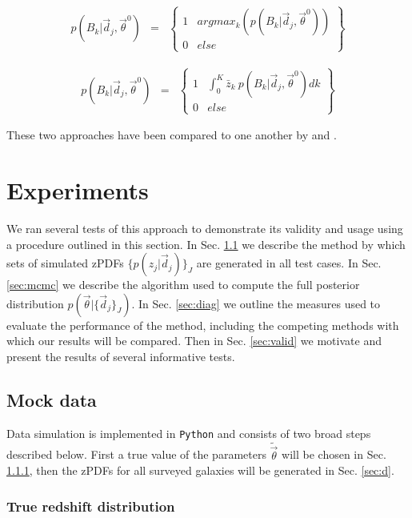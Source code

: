 \documentclass[preprint]{aastex}
\begin{document}
\begin{eqnarray}
\label{eq:map}
p(B_{k}|\vec{d}_{j},\vec{\theta}^{0}) &=& \left\{\begin{array}{cc}1&argmax_{k}(p(B_{k}|\vec{d}_{j},\vec{\theta}^{0}))\\0&else\end{array}\right\}
\end{eqnarray}

\begin{eqnarray}
\label{eq:expval}
p(B_{k}|\vec{d}_{j},\vec{\theta}^{0}) &=& \left\{\begin{array}{cc}1&\int_{0}^{K} \bar{z}_{k}\ p(B_{k}|\vec{d}_{j},\vec{\theta}^{0}) dk\\0&else\end{array}\right\}
\end{eqnarray}

These two approaches have been compared to one another by \citet{hil11} and \citet{ben12}.

\clearpage
\section{Experiments}
\label{sec:exp}

We ran several tests of this approach to demonstrate its validity and usage using a procedure outlined in this section.  In Sec. \ref{sec:mock} we describe the method by which sets of simulated zPDFs $\{p(z_{j}|\vec{d}_{j})\}_{J}$ are generated in all test cases.  In Sec. \ref{sec:mcmc} we describe the algorithm used to compute the full posterior distribution $p(\vec{\theta}|\{\vec{d}_{j}\}_{J})$.  In Sec. \ref{sec:diag} we outline the measures used to evaluate the performance of the method, including the competing methods with which our results will be compared.  Then in Sec. \ref{sec:valid} we motivate and present the results of several informative tests.

\clearpage
\subsection{Mock data}
\label{sec:mock}

Data simulation is implemented in \texttt{Python} and consists of two broad steps described below.  First a true value of the parameters $\tilde{\vec{\theta}}$ will be chosen in Sec. \ref{sec:theta}, then the zPDFs for all surveyed galaxies will be generated in Sec. \ref{sec:d}.  

\clearpage
\subsubsection{True redshift distribution}
\label{sec:theta}
\end{document}
